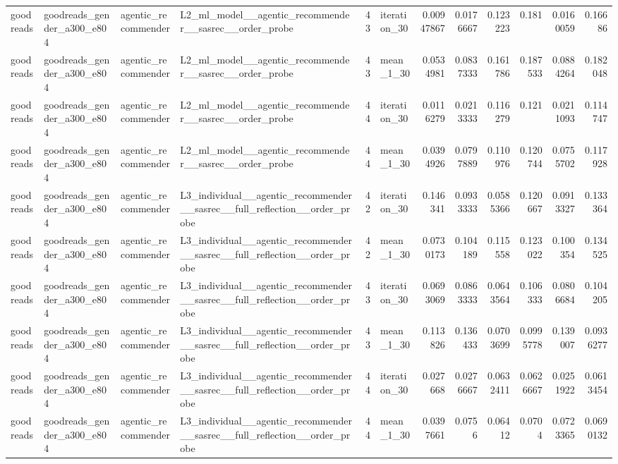 \begin{table}[htbp!]
\begin{tabular}{llllrlrrrrrr}
goodreads & goodreads\_gender\_a300\_e804 & agentic\_recommender & L2\_ml\_model\_\_agentic\_recommender\_\_sasrec\_\_order\_probe & 43 & iteration\_30 & 0.00947867 & 0.0176667 & 0.123223 & 0.181 & 0.0160059 & 0.16686 \\
goodreads & goodreads\_gender\_a300\_e804 & agentic\_recommender & L2\_ml\_model\_\_agentic\_recommender\_\_sasrec\_\_order\_probe & 43 & mean\_1\_30 & 0.0534981 & 0.0837333 & 0.161786 & 0.187533 & 0.0884264 & 0.182048 \\
goodreads & goodreads\_gender\_a300\_e804 & agentic\_recommender & L2\_ml\_model\_\_agentic\_recommender\_\_sasrec\_\_order\_probe & 44 & iteration\_30 & 0.0116279 & 0.0213333 & 0.116279 & 0.121 & 0.0211093 & 0.114747 \\
goodreads & goodreads\_gender\_a300\_e804 & agentic\_recommender & L2\_ml\_model\_\_agentic\_recommender\_\_sasrec\_\_order\_probe & 44 & mean\_1\_30 & 0.0394926 & 0.0797889 & 0.110976 & 0.120744 & 0.0755702 & 0.117928 \\
goodreads & goodreads\_gender\_a300\_e804 & agentic\_recommender & L3\_individual\_\_agentic\_recommender\_\_sasrec\_\_full\_reflection\_\_order\_probe & 42 & iteration\_30 & 0.146341 & 0.0933333 & 0.0585366 & 0.120667 & 0.0913327 & 0.133364 \\
goodreads & goodreads\_gender\_a300\_e804 & agentic\_recommender & L3\_individual\_\_agentic\_recommender\_\_sasrec\_\_full\_reflection\_\_order\_probe & 42 & mean\_1\_30 & 0.0730173 & 0.104189 & 0.115558 & 0.123022 & 0.100354 & 0.134525 \\
goodreads & goodreads\_gender\_a300\_e804 & agentic\_recommender & L3\_individual\_\_agentic\_recommender\_\_sasrec\_\_full\_reflection\_\_order\_probe & 43 & iteration\_30 & 0.0693069 & 0.0863333 & 0.0643564 & 0.106333 & 0.0806684 & 0.104205 \\
goodreads & goodreads\_gender\_a300\_e804 & agentic\_recommender & L3\_individual\_\_agentic\_recommender\_\_sasrec\_\_full\_reflection\_\_order\_probe & 43 & mean\_1\_30 & 0.113826 & 0.136433 & 0.0703699 & 0.0995778 & 0.139007 & 0.0936277 \\
goodreads & goodreads\_gender\_a300\_e804 & agentic\_recommender & L3\_individual\_\_agentic\_recommender\_\_sasrec\_\_full\_reflection\_\_order\_probe & 44 & iteration\_30 & 0.027668 & 0.0276667 & 0.0632411 & 0.0626667 & 0.0251922 & 0.0613454 \\
goodreads & goodreads\_gender\_a300\_e804 & agentic\_recommender & L3\_individual\_\_agentic\_recommender\_\_sasrec\_\_full\_reflection\_\_order\_probe & 44 & mean\_1\_30 & 0.0397661 & 0.0756 & 0.06412 & 0.0704 & 0.0723365 & 0.0690132 \\

\end{tabular}
\end{table}
